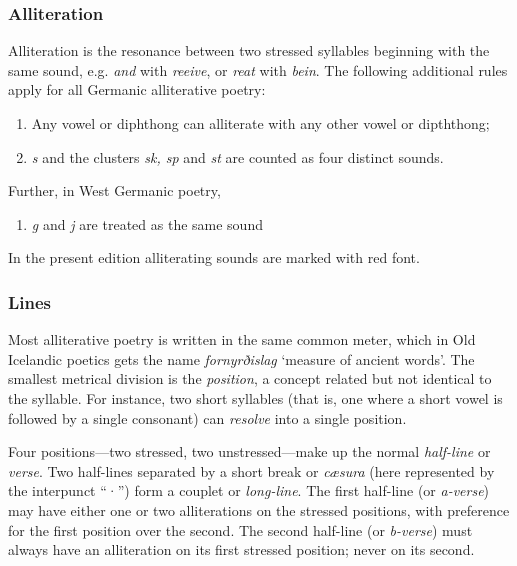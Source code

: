    \subsubsection{Alliteration}
    Alliteration is the resonance between two stressed syllables beginning with the same sound, e.g. \emph{and} with \emph{reeive}, or \emph{reat} with \emph{bein}.  The following additional rules apply for all Germanic alliterative poetry:

    \begin{enumerate}
      \item Any vowel or diphthong can alliterate with any other vowel or dipththong;
      \item \emph{s} and the clusters \emph{sk, sp} and \emph{st} are counted as four distinct sounds.
    \end{enumerate}

    Further, in West Germanic poetry,

    \begin{enumerate}[3]
      \item \emph{g} and \emph{j} are treated as the same sound
    \end{enumerate}

    In the present edition alliterating sounds are marked with red font.

    \subsubsection{Lines}
    Most alliterative poetry is written in the same common meter, which in Old Icelandic poetics gets the name \emph{fornyrðislag} ‘measure of ancient words’.  The smallest metrical division is the \emph{position}, a concept related but not identical to the syllable.  For instance, two short syllables (that is, one where a short vowel is followed by a single consonant) can \emph{resolve} into a single position.

    Four positions—two stressed, two unstressed—make up the normal \emph{half-line} or \emph{verse}.  Two half-lines separated by a short break or \emph{cæsura} (here represented by the interpunct “·”) form a couplet or \emph{long-line}.  The first half-line (or \emph{a-verse}) may have either one or two alliterations on the stressed positions, with preference for the first position over the second.  The second half-line (or \emph{b-verse}) must always have an alliteration on its first stressed position; never on its second.

